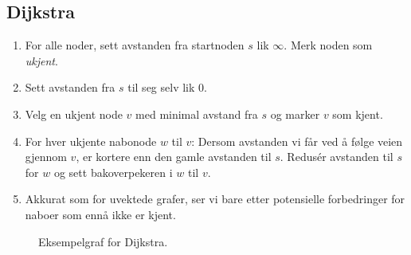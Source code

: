 \documentclass[11pt,a4paper]{article}
\theoremstyle{def}
\begin{document}
\subsection{Dijkstra}
\begin{enumerate}
\item
For alle noder, sett avstanden fra startnoden $s$ lik $\infty$. Merk noden som \textit{ukjent}.
\item
Sett avstanden fra $s$ til seg selv lik 0.
\item
Velg en ukjent node $v$ med minimal avstand fra $s$ og marker $v$ som kjent.
\item
For hver ukjente nabonode $w$ til $v$: Dersom avstanden vi får ved å følge veien gjennom $v$, er kortere enn den gamle avstanden til $s$. Redusér avstanden til $s$ for $w$ og sett bakoverpekeren i $w$ til $v$.
\item
Akkurat som for uvektede grafer, ser vi bare etter potensielle forbedringer for naboer som ennå ikke er kjent.
\end{enumerate}

\begin{figure}[h!]
\centering
{}
\caption{Eksempelgraf for Dijkstra.}
\label{fig:graph2}
\end{figure}
\end{document}
